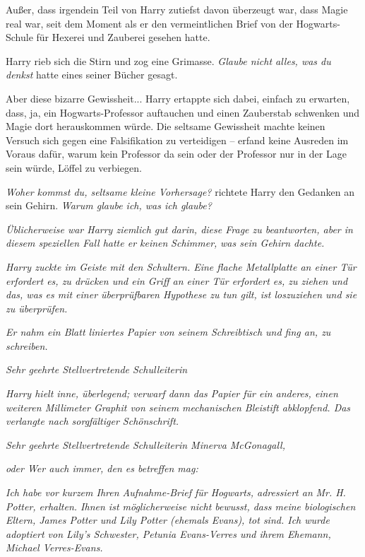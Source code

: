 {Außer, dass irgendein Teil von Harry zutiefst davon überzeugt war, dass Magie real war, seit dem Moment als er den vermeintlichen Brief von der Hogwarts-Schule für Hexerei und Zauberei gesehen hatte.

Harry rieb sich die Stirn und zog eine Grimasse. \emph{Glaube nicht alles, was du denkst} hatte eines seiner Bücher gesagt.

Aber diese bizarre Gewissheit... Harry ertappte sich dabei, einfach zu erwarten, dass, ja, ein Hogwarts-Professor auftauchen und einen Zauberstab schwenken und Magie dort herauskommen würde. Die seltsame Gewissheit machte keinen Versuch sich gegen eine Falsifikation zu verteidigen -- erfand keine Ausreden im Voraus dafür, warum kein Professor da sein oder der Professor nur in der Lage sein würde, Löffel zu verbiegen.

\emph{Woher kommst du, seltsame kleine Vorhersage?} richtete Harry den Gedanken an sein Gehirn. \emph{Warum glaube ich, was ich glaube?}

\emph{Üblicherweise war Harry ziemlich gut darin, diese Frage zu beantworten, aber in diesem speziellen Fall hatte er keinen} \emph{\emph{Schimmer,}} \emph{was sein Gehirn dachte.}

\emph{Harry zuckte im Geiste mit den Schultern. Eine flache Metallplatte an einer Tür erfordert es, zu drücken und ein Griff an einer Tür erfordert es, zu ziehen und das, was es mit einer überprüfbaren Hypothese zu tun gilt, ist loszuziehen und sie zu überprüfen.}

\emph{Er nahm ein Blatt liniertes Papier von seinem Schreibtisch und fing an, zu schreiben.}

\emph{\emph{Sehr geehrte Stellvertretende Schulleiterin}}

\emph{Harry hielt inne, überlegend; verwarf dann das Papier für ein anderes, einen weiteren Millimeter Graphit von seinem mechanischen Bleistift abklopfend. Das verlangte nach sorgfältiger Schönschrift.}

\emph{\emph{Sehr geehrte Stellvertretende Schulleiterin Minerva McGonagall,}}

\emph{oder Wer auch immer, den es betreffen mag:}

\emph{Ich habe vor kurzem Ihren Aufnahme-Brief für Hogwarts, adressiert an} \emph{Mr. H. Potter, erhalten. Ihnen ist möglicherweise nicht bewusst, dass meine biologischen Eltern, James Potter und Lily Potter (ehemals Evans), tot sind. Ich wurde adoptiert von Lily's Schwester, Petunia Evans-Verres und ihrem Ehemann, Michael Verres-Evans.}

}
